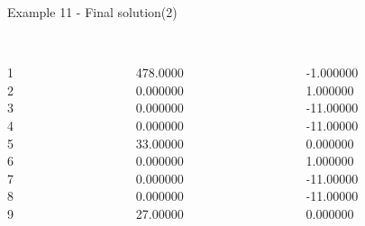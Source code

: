 \begin{frame}{Example 11 - Final solution(2)}
\footnotesize
\begin{columns}[t]
\begin{column}{0.3\textwidth}
\\
1\\
2\\
3\\
4\\
5\\
6\\
7\\
8\\
9\\

\end{column}
\begin{column}{0.3\textwidth}
\\
478.0000\\
0.000000\\
0.000000\\
0.000000\\
33.00000\\
0.000000\\
0.000000\\
0.000000\\
27.00000\\
\end{column}  

\begin{column}{0.3\textwidth}
\\
-1.000000\\
1.000000\\
-11.00000\\
-11.00000\\
0.000000\\
1.000000\\
-11.00000\\
-11.00000\\
0.000000\\
\end{column}
\end{columns}  
\end{frame}

